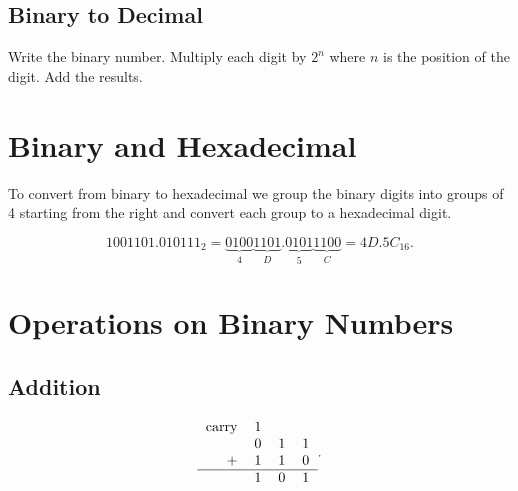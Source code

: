 \documentclass{report}
\begin{document}

\subsection{Binary to Decimal}

\begin{enumerate}
	\ii Write the binary number.
	\ii Multiply each digit by $2^n$ where $n$ is the position of the digit.
	\ii Add the results.
\end{enumerate}



\section{Binary and Hexadecimal}

To convert from binary to hexadecimal we group the binary digits into groups of 4 starting from the right and convert each group to a hexadecimal digit.

\[
	1001101.010111_2 = \underbrace{0100}_{4} \underbrace{1101}_{D} . \underbrace{0101}_{5} \underbrace{1100}_{C} = 4D.5C_{16}
	.\]

\section{Operations on Binary Numbers}

\subsection{Addition}

\[
	\arraycolsep=1.4pt
	\begin{tabular}{r c c c}
		\text{carry} & 1 &   &   \\
		             & 0 & 1 & 1 \\
		+            & 1 & 1 & 0 \\
		\hline
		             & 1 & 0 & 1 \\
	\end{tabular}
	.\]
\end{document}
